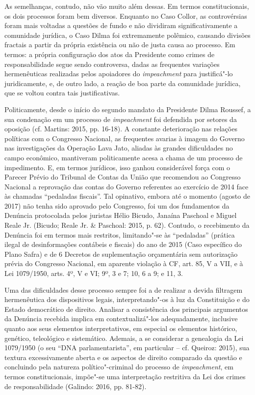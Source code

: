 As semelhanças, contudo, não vão muito além dessas. Em termos
constitucionais, os dois processos foram bem diversos. Enquanto no Caso
Collor, as controvérsias foram mais voltadas a questões de fundo e não
dividiram significativamente a comunidade jurídica, o Caso Dilma foi
extremamente polêmico, causando divisões fractais a partir da própria
existência ou não de justa causa ao processo. Em termos: a própria
configuração dos atos da Presidente como crimes de responsabilidade
segue sendo controversa, dadas as frequentes variações hermenêuticas
realizadas pelos apoiadores do \emph{impeachment} para justificá"-lo
juridicamente, e, de outro lado, a reação de boa parte da comunidade
jurídica, que se voltou contra tais justificativas.

Politicamente, desde o início do segundo mandato da Presidente Dilma
Roussef, a sua condenação em um processo de \emph{impeachment} foi
defendida por setores da oposição (cf. Martins: 2015, pp. 16-18). A
constante deterioração nas relações políticas com o Congresso Nacional,
as frequentes avarias à imagem do Governo nas investigações da Operação
Lava Jato, aliadas às grandes dificuldades no campo econômico,
mantiveram politicamente acesa a chama de um processo de impedimento. E,
em termos jurídicos, isso ganhou considerável força com o Parecer Prévio
do Tribunal de Contas da União que recomendou ao Congresso Nacional a
reprovação das contas do Governo referentes ao exercício de 2014 face às
chamadas ``pedaladas fiscais''. Tal opinativo, embora até o momento
(agosto de 2017) não tenha sido aprovado pelo Congresso, foi um dos
fundamentos da Denúncia protocolada pelos juristas Hélio Bicudo, Janaína
Paschoal e Miguel Reale Jr. (Bicudo; Reale Jr. \& Paschoal: 2015, p.
62). Contudo, o recebimento da Denúncia foi em termos mais restritos,
limitando"-se às ``pedaladas'' (prática ilegal de desinformações
contábeis e fiscais) do ano de 2015 (Caso específico do Plano Safra) e
de 6 Decretos de suplementação orçamentária sem autorização prévia do
Congresso Nacional, em aparente violação à CF, art. 85, V a VII, e à Lei
1079/1950, arts. 4º, V e VI; 9º, 3 e 7; 10, 6 a 9; e 11, 3.

Uma das dificuldades desse processo sempre foi a de realizar a devida
filtragem hermenêutica dos dispositivos legais, interpretando"-os à luz
da Constituição e do Estado democrático de direito. Analisar a
consistência dos principais argumentos da Denúncia recebida implica em
contextualizá"-los adequadamente, inclusive quanto aos seus elementos
interpretativos, em especial os elementos histórico, genético,
teleológico e sistemático. Ademais, a se considerar a genealogia da Lei
1079/1950 (o seu ``DNA parlamentarista'', em particular -- cf. Queiroz:
2015), sua textura excessivamente aberta e os aspectos de direito
comparado da questão e concluindo pela natureza político"-criminal do
processo de \emph{impeachment}, em termos constitucionais, impõe"-se uma
interpretação restritiva da Lei dos crimes de responsabilidade (Galindo:
2016, pp. 81-82).

